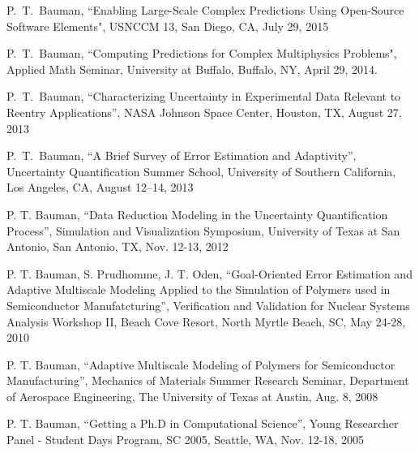 P.~T.~Bauman,
``Enabling Large-Scale Complex Predictions Using Open-Source Software Elements",
USNCCM 13, San Diego, CA, July 29, 2015

\blankline

P.~T.~Bauman,
``Computing Predictions for Complex Multiphysics Problems",
Applied Math Seminar, University at Buffalo, Buffalo, NY, April 29, 2014.

\blankline

P.~T.~Bauman,
``Characterizing Uncertainty in Experimental Data Relevant to Reentry Applications'',
NASA Johnson Space Center, Houston, TX, August 27, 2013

\blankline

P.~T.~Bauman,
``A Brief Survey of Error Estimation and Adaptivity'',
Uncertainty Quantification Summer School,
University of Southern California, Los Angeles, CA, August 12--14, 2013

\blankline

P. T. Bauman,
``Data Reduction Modeling in the Uncertainty Quantification Process'',
Simulation and Visualization Symposium, University of Texas at San Antonio, San Antonio, TX, Nov. 12-13, 2012

\blankline

P. T. Bauman, S. Prudhomme, J. T. Oden,
``Goal-Oriented Error Estimation and Adaptive Multiscale Modeling Applied to the Simulation of Polymers used in Semiconductor Manufatcturing'',
Verification and Validation for Nuclear Systems Analysis Workshop II,
Beach Cove Resort, North Myrtle Beach, SC, May 24-28, 2010

\blankline

P. T. Bauman,
``Adaptive Multiscale Modeling of Polymers for Semiconductor Manufacturing'',
Mechanics of Materials Summer Research Seminar,
Department of Aerospace Engineering, The University of Texas at Austin, Aug. 8, 2008

\blankline

P. T. Bauman,
``Getting a Ph.D in Computational Science'',
Young Researcher Panel - Student Days Program, SC 2005, Seattle, WA, Nov. 12-18, 2005 

